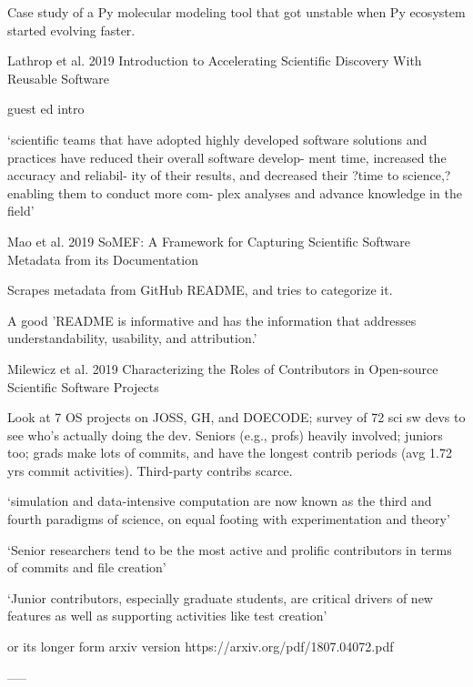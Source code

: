 \documentclass[12pt]{amsart}
\begin{document}
Case study of a Py molecular modeling tool that got unstable when Py ecosystem started evolving faster.




Lathrop et al. 2019 Introduction to Accelerating Scientific Discovery With Reusable Software

guest ed intro 

`scientific teams that have adopted highly developed software solutions and practices have reduced their overall software develop- ment time, increased the accuracy and reliabil- ity of their results, and decreased their ?time to science,? enabling them to conduct more com- plex analyses and advance knowledge in the field'



Mao et al. 2019 SoMEF: A Framework for Capturing Scientific Software Metadata from its Documentation

Scrapes metadata from GitHub README, and tries to categorize it. 

A good 'README is informative and has the information that addresses understandability, usability, and attribution.'



Milewicz et al. 2019 Characterizing the Roles of Contributors in Open-source Scientific Software Projects

Look at 7 OS projects on JOSS, GH, and DOECODE; survey of 72 sci sw devs to see who's actually doing the dev. Seniors (e.g., profs) heavily involved; juniors too; grads make lots of commits, and have the longest contrib periods (avg 1.72 yrs commit activities). Third-party contribs scarce.

`simulation and data-intensive computation are now known as the third and fourth paradigms of science, on equal footing with experimentation and theory'

`Senior researchers tend to be the most active and prolific contributors in terms of commits and file creation'

`Junior contributors, especially graduate students, are critical drivers of new features as well as supporting activities like test creation'












or its longer form arxiv version
https://arxiv.org/pdf/1807.04072.pdf


-----
\end{document}
